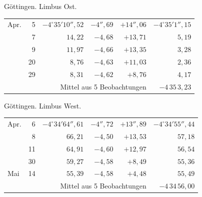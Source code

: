 \noindent\begin{minipage}[t]{.495\textwidth}\centering Göttingen. Limbus Ost.\par\smallskip
{\scriptsize\setlength{\tabcolsep}{1pt}\renewcommand{\arraystretch}{1.2}\begin{tabular}{lr|r|r|r|r|}
Apr.&5&$-4^\circ35'10''{,}52$&$-4''{,}69$&$+14''{,}06$&$-4^\circ35'1''{,}15$\\
&7&$14{,}22$&$-4{,}68$&$+13{,}71$&$5{,}19$\\
&9&$11{,}97$&$-4{,}66$&$+13{,}35$&$3{,}28$\\
&20&$8{,}76$&$-4{,}63$&$+11{,}03$&$2{,}36$\\
&29&$8{,}31$&$-4{,}62$&$+8{,}76$&$4{,}17$\\
\cline{6-6}\multicolumn{5}{r}{Mittel aus 5 Beobachtungen}&$-4\,35\,3{,}23$
\end{tabular}}\end{minipage}\hfill\begin{minipage}[t]{.495\textwidth}\centering Göttingen. Limbus West.\par\smallskip
{\scriptsize\setlength{\tabcolsep}{1pt}\renewcommand{\arraystretch}{1.2}\begin{tabular}{lr|r|r|r|r}
Apr.&6&$-4^\circ34'64''{,}61$&$-4''{,}72$&$+13''{,}89$&$-4^\circ34'55''{,}44$\\
&8&$66{,}21$&$-4{,}50$&$+13{,}53$&$57{,}18$\\
&11&$64{,}91$&$-4{,}60$&$+12{,}97$&$56{,}54$\\
&30&$59{,}27$&$-4{,}58$&$+8{,}49$&$55{,}36$\\
Mai&14&$55{,}39$&$-4{,}58$&$+4{,}48$&$55{,}49$\\
\cline{6-6}\multicolumn{5}{r}{Mittel aus 5 Beobachtungen}&$-4\,34\,56{,}00$
\end{tabular}}\end{minipage}
\par\vspace{4mm}

